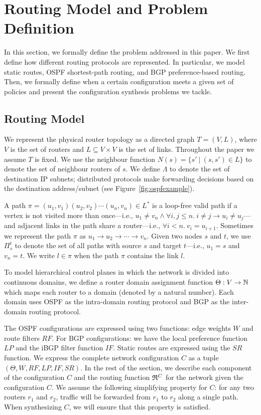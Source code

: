 \section{Routing Model and Problem Definition}
In this section, we formally define the problem addressed in this
paper.  We first define how different
routing protocols are represented.  In particular, we model static
routes, OSPF shortest-path routing, and BGP preference-based routing.
Then, we formally define when a certain configuration meets a given
set of policies and present the configuration synthesis problems
we tackle.

\subsection{Routing Model}

We represent the physical router topology as a directed graph $T=(V, L)$,
where $V$ is the set of routers and $L\subseteq V\times V$ is the set of links. 
Throughout the paper we assume $T$ is fixed.
We use the neighbour function $N(s) = \{s'\ | \ (s,s') \in L \}$ to denote 
the set of neighbour routers of $s$. 
We define $\Lambda$ to denote the set of destination IP subnets;
distributed protocols make forwarding decisions based on the 
destination address/subnet (see Figure~\ref{fig:ospfexample}).

A path $\pi = (u_1,v_1) (u_2, v_2) \cdots (u_n, v_n) \in L^*$ is a loop-free valid path if
a  vertex is not visited more than once---i.e.,
$u_1\neq v_n\wedge\forall i,j \leq n. 
~i \not= j \rightarrow u_i \not= u_j$---and adjacent links in the
path share a router---i.e., $\forall i < n. ~v_i = u_{i+1}$.
Sometimes we represent the path $\pi$ as $u_1\rightarrow u_2 \rightarrow  \cdots \rightarrow v_n$.
Given two nodes $s$ and $t$, we use $\Pi_s^t$ to denote the set of all paths
with source $s$ and target $t$---i.e., $u_1=s$ and  $v_n=t$. 
We write $l \in \pi$ when the path $\pi$ contains the link $l$. 

To model hierarchical control planes in which
 the network is divided into continuous domains,
we define a router domain assignment function
$\Theta: V \rightarrow \mathbb{N}$ which maps each router to a domain 
(denoted by a natural number).
Each domain uses OSPF as the intra-domain routing protocol
and BGP as the inter-domain routing protocol. 


The OSPF configurations are expressed 
using two functions: edge weights $W$ and
 route filters $RF$. For BGP configurations: 
we have the local preference function $LP$ 
and the iBGP filter function $IF$. Static 
routes are expressed using the $SR$ function.
We express the complete network configuration $C$
as a tuple $(\Theta,W,RF,LP,IF,SR)$.  In the 
rest of the section, we describe each component 
of the configuration $C$ and the routing function 
$\mathfrak{R}^C$ for the network given the configuration $C$. 
We assume the following  
simplifying property for $C$: for any two 
routers $r_1$ and $r_2$,
traffic will be forwarded from $r_1$ to $r_2$ 
along a single path. 
When synthesizing $C$, we will ensure that this property is satisfied.



